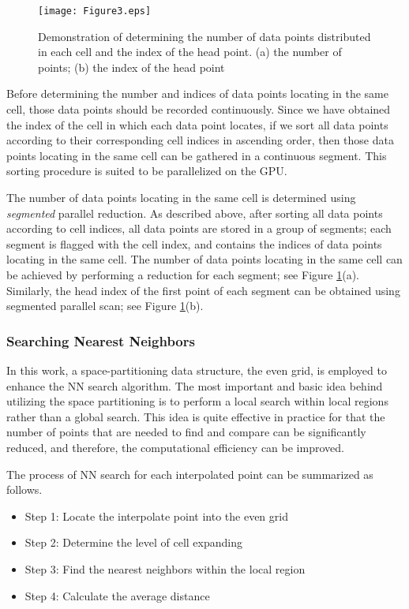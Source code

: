 \documentclass[final,5p,times,twocolumn,authoryear]{elsarticle}
\begin{document}
			\begin{figure}[ht]
				\centering
				\texttt{[image: Figure3.eps]}
				\caption{Demonstration of determining the number of data points 
							distributed in each cell and the index of the head point. (a) the number of 
							points; (b) the index of the head point}
				\label{fig3}
			\end{figure}
			
			
			Before determining the number and indices of data points locating in the 
			same cell, those data points should be recorded continuously. Since we have 
			obtained the index of the cell in which each data point locates, if we sort 
			all data points according to their corresponding cell indices in ascending 
			order, then those data points locating in the same cell can be gathered in a 
			continuous segment. This sorting procedure is suited to be parallelized on 
			the GPU.
			
			The number of data points locating in the same cell is determined using 
			\textit{segmented} parallel reduction. As described above, after sorting all data points 
			according to cell indices, all data points are stored in a group of 
			segments; each segment is flagged with the cell index, and contains the 
			indices of data points locating in the same cell. The number of data points 
			locating in the same cell can be achieved by performing a reduction for each 
			segment; see Figure \ref{fig3}(a). Similarly, the head index of the first point of 
			each segment can be obtained using segmented parallel scan; see Figure \ref{fig3}(b).
			
			\subsubsection{Searching Nearest Neighbors}
			
			In this work, a space-partitioning data structure, the even grid, is 
			employed to enhance the NN search algorithm. The most important and basic 
			idea behind utilizing the space partitioning is to perform a local search 
			within local regions rather than a global search. This idea is quite 
			effective in practice for that the number of points that are needed to find 
			and compare can be significantly reduced, and therefore, the computational 
			efficiency can be improved.
			
			The process of NN search for each interpolated point can be summarized as 
			follows.
			\begin{itemize}
				\item Step 1: Locate the interpolate point into the even grid
				\item Step 2: Determine the level of cell expanding
				\item Step 3: Find the nearest neighbors within the local region
				\item Step 4: Calculate the average distance
			\end{itemize}
			
\end{document}
